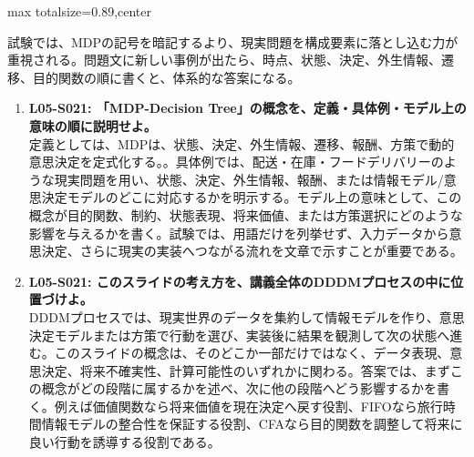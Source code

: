 \begin{minipage}[t]{0.58\textwidth}
\begin{adjustbox}{max totalsize={\textwidth}{0.89\textheight},center}
\begin{minipage}{\textwidth}
試験では、MDPの記号を暗記するより、現実問題を構成要素に落とし込む力が重視される。問題文に新しい事例が出たら、時点、状態、決定、外生情報、遷移、目的関数の順に書くと、体系的な答案になる。\par{}\begin{enumerate}\item \textbf{L05-S021: 「MDP-Decision Tree」の概念を、定義・具体例・モデル上の意味の順に説明せよ。}\\定義としては、MDPは、状態、決定、外生情報、遷移、報酬、方策で動的意思決定を定式化する。。具体例では、配送・在庫・フードデリバリーのような現実問題を用い、状態、決定、外生情報、報酬、または情報モデル/意思決定モデルのどこに対応するかを明示する。モデル上の意味として、この概念が目的関数、制約、状態表現、将来価値、または方策選択にどのような影響を与えるかを書く。試験では、用語だけを列挙せず、入力データから意思決定、さらに現実の実装へつながる流れを文章で示すことが重要である。\item \textbf{L05-S021: このスライドの考え方を、講義全体のDDDMプロセスの中に位置づけよ。}\\DDDMプロセスでは、現実世界のデータを集約して情報モデルを作り、意思決定モデルまたは方策で行動を選び、実装後に結果を観測して次の状態へ進む。このスライドの概念は、そのどこか一部だけではなく、データ表現、意思決定、将来不確実性、計算可能性のいずれかに関わる。答案では、まずこの概念がどの段階に属するかを述べ、次に他の段階へどう影響するかを書く。例えば価値関数なら将来価値を現在決定へ戻す役割、FIFOなら旅行時間情報モデルの整合性を保証する役割、CFAなら目的関数を調整して将来に良い行動を誘導する役割である。\end{enumerate}
\end{minipage}
\end{adjustbox}
\end{minipage}


